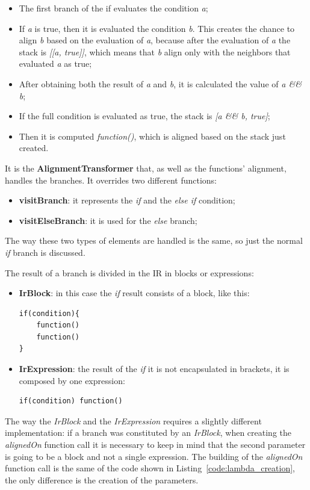 \begin{itemize}
    \item The first branch of the if evaluates the condition \textit{a};
    \item If \textit{a} is true, then it is evaluated the condition \textit{b}. This creates the chance to align \textit{b} based on the evaluation of \textit{a}, because after the evaluation of \textit{a} the stack is \textit{[[a, true]]}, which means that \textit{b} align only with the neighbors that evaluated \textit{a} as true;
    \item After obtaining both the result of \textit{a} and \textit{b}, it is calculated the value of \textit{a \&\& b};
    \item If the full condition is evaluated as true, the stack is \textit{[a \&\& b, true]};
    \item Then it is computed \textit{function()}, which is aligned based on the stack just created.
\end{itemize}

It is the \textbf{AlignmentTransformer} that, as well as the functions' alignment, handles the branches. It overrides two different functions:
\begin{itemize}
    \item \textbf{visitBranch}: it represents the \textit{if} and the \textit{else if} condition;
    \item \textbf{visitElseBranch}: it is used for the \textit{else} branch;
\end{itemize}
The way these two types of elements are handled is the same, so just the normal \textit{if} branch is discussed.

The result of a branch is divided in the IR in blocks or expressions:
\begin{itemize}
    \item \textbf{IrBlock}: in this case the \textit{if} result consists of a block, like this:
\begin{lstlisting}
if(condition){
    function()
    function()
}
\end{lstlisting} 
    \item \textbf{IrExpression}: the result of the \textit{if} it is not encapsulated in brackets, it is composed by one expression:
\begin{lstlisting}
if(condition) function()
\end{lstlisting}
\end{itemize}

The way the \textit{IrBlock} and the \textit{IrExpression} requires a slightly different implementation: if a branch was constituted by an \textit{IrBlock}, when creating the \textit{alignedOn} function call it is necessary to keep in mind that the second parameter is going to be a block and not a single expression.\newline
The building of the \textit{alignedOn} function call is the same of the code shown in Listing~\ref{code:lambda_creation}, the only difference is the creation of the parameters. 

